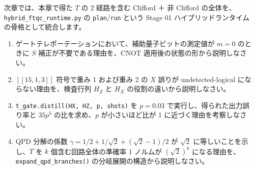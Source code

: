 次章では、本章で得た $T$ の 2 経路を含む Clifford ＋ 非 Clifford の全体を、\texttt{hybrid\_ftqc\_runtime.py} の \texttt{plan}/\texttt{run} という Stage 01 ハイブリッドランタイムの骨格として統合します。

\begin{exercise}
  \begin{enumerate}
    \item ゲートテレポーテーションにおいて、補助量子ビットの測定値が $m=0$ のときに $S$ 補正が不要である理由を、$\mathrm{CNOT}$ 適用後の状態の形から説明しなさい。
    \item $[[15,1,3]]$ 符号で重み 1 および重み 2 の $X$ 誤りが undetected-logical にならない理由を、検査行列 $H_Z$ と $H_X$ の役割の違いから説明しなさい。
    \item \texttt{t\_gate.distill(HX, HZ, p, shots)} を $p=0.03$ で実行し、得られた出力誤り率と $35p^3$ の比を求め、$p$ が小さいほど比が 1 に近づく理由を考察しなさい。
    \item QPD 分解の係数 $\gamma=1/2+1/\sqrt2+(\sqrt2-1)/2$ が $\sqrt2$ に等しいことを示し、$T$ を $k$ 個含む回路全体の準確率 1 ノルムが $(\sqrt2)^k$ になる理由を、\texttt{expand\_qpd\_branches()} の分岐展開の構造から説明しなさい。
  \end{enumerate}
\end{exercise}
